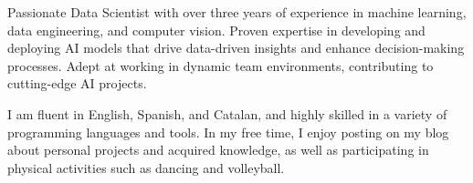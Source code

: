 

\begin{cvparagraph}


Passionate Data Scientist with over three years of experience in machine
learning, data engineering, and computer vision. Proven expertise in developing
and deploying AI models that drive data-driven insights and enhance
decision-making processes. Adept at working in dynamic team environments,
contributing to cutting-edge AI projects.

I am fluent in English, Spanish, and Catalan, and highly skilled in a variety
of programming languages and tools. In my free time, I enjoy posting on my blog
about personal projects and acquired knowledge, as well as participating in
physical activities such as dancing and volleyball.


\end{cvparagraph}
